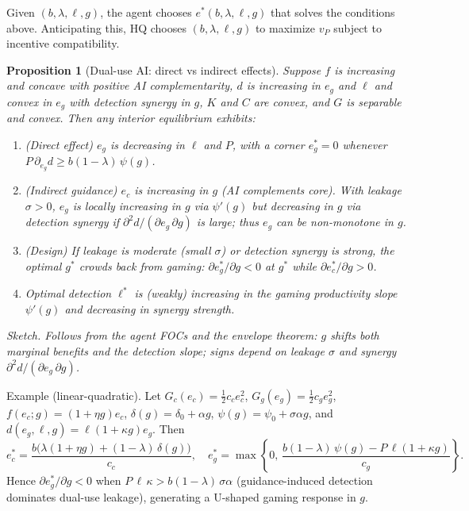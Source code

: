 \documentclass[11pt]{article}
\newtheorem{proposition}{Proposition}
\begin{document}
Given $(b,\lambda,\ell,g)$, the agent chooses $e^*(b,\lambda,\ell,g)$ that solves the conditions above. Anticipating this, HQ chooses $(b,\lambda,\ell,g)$ to maximize $v_P$ subject to incentive compatibility.

\begin{proposition}[Dual-use AI: direct vs indirect effects]
Suppose $f$ is increasing and concave with positive AI complementarity, $d$ is increasing in $e_g$ and $\ell$ and convex in $e_g$ with detection synergy in $g$, $K$ and $C$ are convex, and $G$ is separable and convex. Then any interior equilibrium exhibits:
\begin{enumerate}
    \item (Direct effect) $e_g$ is decreasing in $\ell$ and $P$, with a corner $e_g^*=0$ whenever $P\, \partial_{e_g} d \ge b(1-\lambda)\, \psi(g)$.
    \item (Indirect guidance) $e_c$ is increasing in $g$ (AI complements core). With leakage $\sigma>0$, $e_g$ is locally increasing in $g$ via $\psi'(g)$ but decreasing in $g$ via detection synergy if $\partial^2 d/(\partial e_g \, \partial g)$ is large; thus $e_g$ can be non-monotone in $g$.
    \item (Design) If leakage is moderate (small $\sigma$) or detection synergy is strong, the optimal $g^*$ crowds back from gaming: $\partial e_g^*/\partial g < 0$ at $g^*$ while $\partial e_c^*/\partial g > 0$.
    \item Optimal detection $\ell^*$ is (weakly) increasing in the gaming productivity slope $\psi'(g)$ and decreasing in synergy strength.
\end{enumerate}
\emph{Sketch.} Follows from the agent FOCs and the envelope theorem: $g$ shifts both marginal benefits and the detection slope; signs depend on leakage $\sigma$ and synergy $\partial^2 d/(\partial e_g \, \partial g)$.
\end{proposition}

\noindent Example (linear-quadratic). Let $G_c(e_c)=\tfrac{1}{2} c_c e_c^2$, $G_g(e_g)=\tfrac{1}{2} c_g e_g^2$, $f(e_c; g)=(1+\eta g) e_c$, $\delta(g)=\delta_0+\alpha g$, $\psi(g)=\psi_0+\sigma \alpha g$, and $d(e_g,\ell,g)=\ell (1+\kappa g) e_g$. Then
\[
e_c^* = \frac{b\big( \lambda (1+\eta g) + (1-\lambda)\, \delta(g) \big)}{c_c},\quad e_g^* = \max\left\{0,\, \frac{b(1-\lambda)\, \psi(g) - P\, \ell (1+\kappa g)}{c_g} \right\}.
\]
Hence $\partial e_g^*/\partial g < 0$ when $P\, \ell \, \kappa > b(1-\lambda)\, \sigma \alpha$ (guidance-induced detection dominates dual-use leakage), generating a U-shaped gaming response in $g$.
\end{document}

